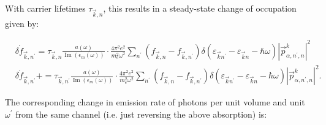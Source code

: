 \documentclass[10pt]{article}
\begin{document}
With carrier lifetimes $\tau_{\vec{k}, n}$, this results in a steady-state change of occupation given by:

$$
\begin{aligned}
& \delta \dot{f}_{\vec{k}, n^{\prime}}=\tau_{\vec{k}, n} \frac{a(\omega)}{\operatorname{Im}\left(\epsilon_{m}(\omega)\right)} \cdot \frac{4 \pi^{2} e^{2}}{m_{e}^{2} \omega^{2}} \sum_{n^{\prime}}\left(f_{\vec{k}, n}-f_{\vec{k}, n^{\prime}}\right) \delta\left(\varepsilon_{\vec{k} n^{\prime}}-\varepsilon_{\vec{k} n}-\hbar \omega\right)\left|\vec{p}_{\alpha, n^{\prime}, n}^{k}\right|^{2} \\
& \delta \dot{f}_{\vec{k}, n^{\prime}}+=\tau_{\vec{k}, n^{\prime}} \frac{a(\omega)}{\operatorname{Im}\left(\epsilon_{m}(\omega)\right)} \cdot \frac{4 \pi^{2} e^{2}}{m_{e}^{2} \omega^{2}} \sum_{n^{\prime}}\left(f_{\vec{k}, n}-f_{\vec{k}, n^{\prime}}\right) \delta\left(\varepsilon_{\vec{k} n^{\prime}}-\varepsilon_{\vec{k} n}-\hbar \omega\right)\left|\vec{p}_{\alpha, n^{\prime}, n}^{k}\right|^{2} .
\end{aligned}
$$

The corresponding change in emission rate of photons per unit volume and unit $\omega^{\prime}$ from the same channel (i.e. just reversing the above absorption) is:
\end{document}

